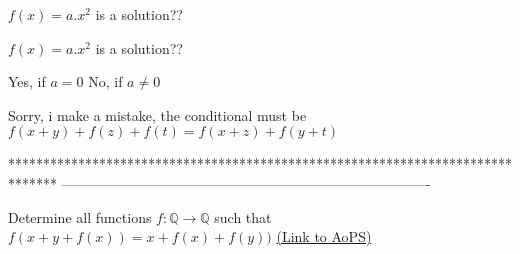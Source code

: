 \begin{solution}
	$f(x)= a.x^2$ is a solution??
\end{solution}



\begin{solution}
	\begin{tcolorbox}$f(x)= a.x^2$ is a solution??\end{tcolorbox}
Yes, if $a=0$
No, if $a\ne 0$
\end{solution}



\begin{solution}
	Sorry, i make a mistake, the conditional must be
$f(x+y)+f(z)+f(t)=f(x+z)+f(y+t)$
\end{solution}
*******************************************************************************
-------------------------------------------------------------------------------

\begin{problem}
	Determine all functions $f : \mathbb{Q} \to \mathbb{Q}$ such that $f(x+y+f(x))= x+ f(x) +f(y))$
	\flushright \href{https://artofproblemsolving.com/community/c6h558485}{(Link to AoPS)}
\end{problem}



